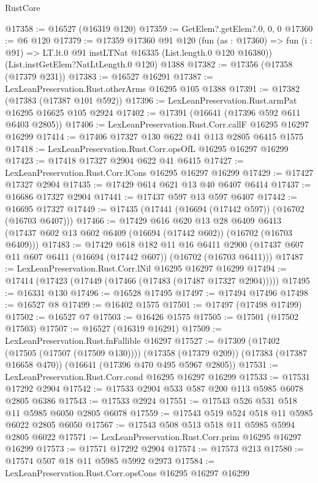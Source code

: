 \begin{lexlean}{RustCore}
\begin{coremodule}
@17358 := @16527 (@16319 @120)
@17359 := GetElem?.getElem?.{0, 0, 0}
@17360 := @6 @120
@17379 := @17359
    @17360
    @91
    @120
    (fun (as : @17360) =>
    fun (i : @91) => LT.lt.{0} @91 instLTNat @16335 (List.length.{0} @120 @16380))
    (List.instGetElem?NatLtLength.{0} @120)
    @1388
@17382 := @17356 (@17358 (@17379 @231))
@17383 := @16527 @16291
@17387 := LexLeanPreservation.Rust.otherArms @16295 @105 @1388
@17391 := @17382 (@17383 (@17387 @101 @592))
@17396 := LexLeanPreservation.Rust.armPat @16295 @16625 @105 @2924
@17402 := @17391 (@16641 (@17396 @592 @611 @6403 @2805))
@17406 := LexLeanPreservation.Rust.Corr.callF @16295 @16297 @16299
@17414 := @17406 @17327 @130 @622 @41 @113 @2805 @6415 @1575
@17418 := LexLeanPreservation.Rust.Corr.opsOfL @16295 @16297 @16299
@17423 := @17418 @17327 @2904 @622 @41 @6415
@17427 := LexLeanPreservation.Rust.Corr.lCons @16295 @16297 @16299
@17429 := @17427 @17327 @2904
@17435 := @17429 @614 @621 @13 @40 @6407 @6414
@17437 := @16686 @17327 @2904
@17441 := @17437 @597 @13 @597 @6407
@17442 := @16695 @17327
@17449 := @17435 (@17441 (@16694 (@17442 @597)) (@16702 (@16703 @6407)))
@17466 := @17429
    @616
    @620
    @13
    @28
    @6409
    @6413
    (@17437 @602 @13 @602 @6409 (@16694 (@17442 @602)) (@16702 (@16703 @6409)))
@17483 := @17429
    @618
    @182
    @11
    @16
    @6411
    @2900
    (@17437 @607 @11 @607 @6411 (@16694 (@17442 @607)) (@16702 (@16703 @6411)))
@17487 := LexLeanPreservation.Rust.Corr.lNil @16295 @16297 @16299
@17494 := @17414 (@17423 (@17449 (@17466 (@17483 (@17487 @17327 @2904)))))
@17495 := @16331 @130
@17496 := @16528 @17495
@17497 := @17494 @17496
@17498 := @16527 @8
@17499 := @16402 @1575
@17501 := @17497 (@17498 @17499)
@17502 := @16527 @7
@17503 := @16426 @1575
@17505 := @17501 (@17502 @17503)
@17507 := @16527 (@16319 @16291)
@17509 := LexLeanPreservation.Rust.fnFallible @16297
@17527 := @17309
    (@17402 (@17505 (@17507 (@17509 @130))))
    (@17358 (@17379 @209))
    (@17383 (@17387 @16658 @470))
    (@16641 (@17396 @470 @495 @5967 @2805))
@17531 := LexLeanPreservation.Rust.Corr.cond @16295 @16297 @16299
@17533 := @17531 @17292 @2904
@17542 := @17533 @2904 @533 @587 @200 @113 @5985 @6078 @2805 @6386
@17543 := @17533 @2924
@17551 := @17543 @526 @531 @518 @11 @5985 @6050 @2805 @6078
@17559 := @17543 @519 @524 @518 @11 @5985 @6022 @2805 @6050
@17567 := @17543 @508 @513 @518 @11 @5985 @5994 @2805 @6022
@17571 := LexLeanPreservation.Rust.Corr.prim @16295 @16297 @16299
@17573 := @17571 @17292 @2904
@17574 := @17573 @213
@17580 := @17574 @507 @18 @11 @5985 @5992 @2973
@17584 := LexLeanPreservation.Rust.Corr.opsCons @16295 @16297 @16299

\end{coremodule}
\end{lexlean}
